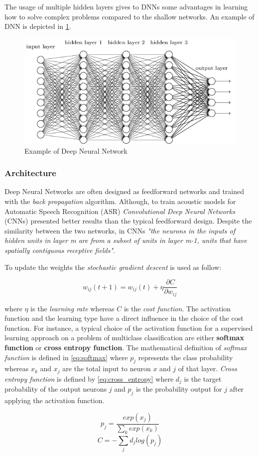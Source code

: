 \noindent The usage of multiple hidden layers gives to DNNs some advantages in learning how to solve complex problems compared to the shallow networks.\cite{dnn_website} An example of DNN is depicted in \ref{fig:deep_nn}.

\begin{figure}[!ht]
    \centering
    \includegraphics[scale=0.6]{Figures/deep_nn.png}
    \caption{Example of Deep Neural Network \cite{dnn_website}}
    \label{fig:deep_nn}
\end{figure}

\subsubsection{Architecture}
Deep Neural Networks are often designed as feedforward networks and trained with the \textit{back propagation} algorithm. Although, to train acoustic models for Automatic Speech Recognition (ASR) \textit{Convolutional Deep Neural Networks} (CNNs) presented better results than the typical feedforward design. Despite the similarity between the two networks, in CNNs \textit{"the neurons in the inputs of hidden units in layer m are from a subset of units in layer m-1, units that have spatially contiguous receptive fields"}. \cite{lenet}

\noindent To update the weights the \textit{stochastic gradient descent} is used as follow:

\begin{equation}
    w_{ij}(t+1) = w_{ij}(t) + \eta  \frac{\partial C}{\partial w_{ij}}
\end{equation}

\noindent where $\eta$ is the \textit{learning rate} whereas  $C$ is the \textit{cost function}. The activation function and the learning type have a direct influence in the choice of the cost function. For instance, a typical choice of the activation function for a supervised learning approach on a problem of multiclass classification are either \textbf{softmax function} or \textbf{cross entropy function}. The mathematical definition of \textit{softmax function} is defined in \ref{eq:softmax} where $p_{j}$ represents the class probability whereas $x_{k}$ and $x_{j}$ are the total input to neuron $x$ and $j$ of that layer. \textit{Cross entropy function} is defined by \ref{eq:cross_entropy} where $d_{j}$ is the target probability of the output neurons $j$ and $p_{j}$ is the probability output for $j$ after applying the activation function. \cite{deep_learning_wiki}

\begin{equation}\label{eq:softmax}
    p_{j} =  \frac{exp(x_{j})}{ \sum_k exp(x_{k})}
\end{equation}
\begin{equation}\label{eq:cross_entropy}
    C = -\sum_j d_{j}log(p_{j})
\end{equation}
